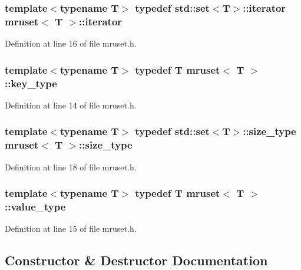 \subsubsection[{iterator}]{\setlength{\rightskip}{0pt plus 5cm}template$<$typename T$>$ typedef std\+::set$<$T$>$\+::{\bf iterator} {\bf mruset}$<$ T $>$\+::{\bf iterator}}\label{classmruset_a246172eda1afff45be47a013c14b1ad6}


Definition at line 16 of file mruset.\+h.

\hypertarget{classmruset_a282941ee7f0438b0c09274b10c78cda0}{}
\subsubsection[{key\+\_\+type}]{\setlength{\rightskip}{0pt plus 5cm}template$<$typename T$>$ typedef T {\bf mruset}$<$ T $>$\+::{\bf key\+\_\+type}}\label{classmruset_a282941ee7f0438b0c09274b10c78cda0}


Definition at line 14 of file mruset.\+h.

\hypertarget{classmruset_aaee46af18d8a5bdc503e9570e499a335}{}
\subsubsection[{size\+\_\+type}]{\setlength{\rightskip}{0pt plus 5cm}template$<$typename T$>$ typedef std\+::set$<$T$>$\+::{\bf size\+\_\+type} {\bf mruset}$<$ T $>$\+::{\bf size\+\_\+type}}\label{classmruset_aaee46af18d8a5bdc503e9570e499a335}


Definition at line 18 of file mruset.\+h.

\hypertarget{classmruset_a834c3e7f8e9cf615ebe27752443f9a3a}{}
\subsubsection[{value\+\_\+type}]{\setlength{\rightskip}{0pt plus 5cm}template$<$typename T$>$ typedef T {\bf mruset}$<$ T $>$\+::{\bf value\+\_\+type}}\label{classmruset_a834c3e7f8e9cf615ebe27752443f9a3a}


Definition at line 15 of file mruset.\+h.



\subsection{Constructor \& Destructor Documentation}
\hypertarget{classmruset_a708b11a33448c283f6f4c8e18fd3098f}{}
